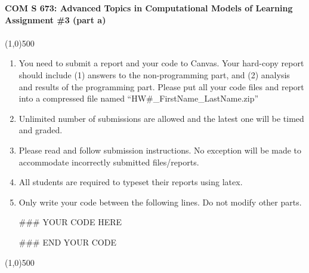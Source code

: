 \documentclass[11pt]{article}
\begin{document}
\begin{center}
{\Large \textbf{COM S 673: Advanced Topics in Computational Models of Learning\\
Assignment \#3 (part a)\\
\vspace{2pt}}}\\
\linethickness{1mm}\line(1,0){500}\\
\begin{enumerate}
    \item You need to submit a report and your code to
    Canvas. Your hard-copy report should include (1) answers to the
    non-programming part, and (2) analysis and results of the
    programming part. Please put all your code files and report into a compressed file
    named ``HW\#\_FirstName\_LastName.zip''
    \item Unlimited number of submissions are allowed and the latest one will be timed and graded.
    \item Please read and follow submission instructions. No exception will be made to accommodate incorrectly submitted files/reports.
    \item All students are required to typeset their reports using latex.
    \item Only write your code between the following lines. Do not modify other parts.

\#\#\# YOUR CODE HERE

\#\#\# END YOUR CODE
\end{enumerate}
\end{center}
\linethickness{1mm}\line(1,0){500}


\end{document}
